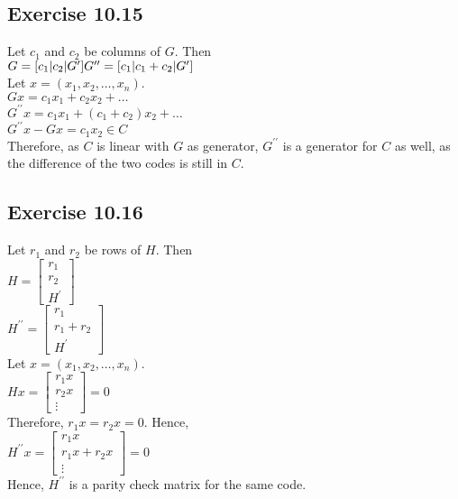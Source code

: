 \documentclass[a4paper,12pt]{article}
\begin{document}
\subsection*{Exercise 10.15}
Let $c_1$ and $c_2$ be columns of $G$. Then\\
$G=[c_1|c_2|G^\prime]\\
G^{\prime\prime}=[c_1|c_1+c_2|G^\prime]$\\
Let $x=(x_1,x_2,\ldots, x_n)$.\\
$Gx=c_1x_1+c_2x_2+\ldots$\\
$G^{\prime\prime}x=c_1x_1+(c_1+c_2)x_2+\ldots$\\
$G^{\prime\prime}x-Gx=c_1x_2\in C$\\
Therefore, as $C$ is linear with $G$ as generator, $G^{\prime\prime}$ is a generator for
$C$ as well, as the difference of the two codes is still in $C$.  
\subsection*{Exercise 10.16}
Let $r_1$ and $r_2$ be rows of $H$. Then\\
$H=\left[\begin{array}{c}
    r_1 \\ \hline
    r_2 \\ \hline
    H^\prime
    \end{array}\right]$\\
$H^{\prime\prime}=\left[\begin{array}{c}
    r_1 \\ \hline
    r_1+r_2 \\ \hline
    H^\prime
    \end{array}\right]$\\
Let $x=(x_1,x_2,\ldots, x_n)$.\\
$Hx=\begin{bmatrix}
    r_1x\\
    r_2x\\
    \vdots
\end{bmatrix}=0$\\
Therefore, $r_1x=r_2x=0$. Hence,\\
$H^{\prime\prime}x=\begin{bmatrix}
    r_1x\\
    r_1x+r_2x\\
    \vdots
\end{bmatrix}=0$\\
Hence, $H^{\prime\prime}$ is a parity check matrix for the same code.
\end{document}
